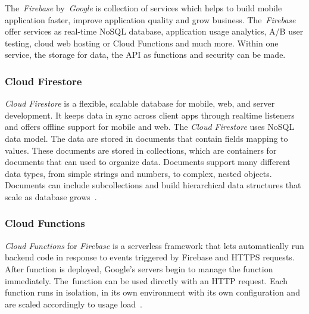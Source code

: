The~\textit{Firebase} by~\textit{Google} is collection of services which helps to build mobile application faster, improve application quality and grow business. The~\textit{Firebase} offer services as real-time NoSQL database, application usage analytics, A/B user testing, cloud web hosting or Cloud Functions and much more. Within one service, the storage for data, the API as functions and security can be made. 
\subsubsection{Cloud Firestore}
\textit{Cloud Firestore} is a flexible, scalable database for mobile, web, and server development. It keeps data in sync across client apps through realtime listeners and offers offline support for mobile and web. The \textit{Cloud Firestore} uses NoSQL data model. The data are stored in documents that contain fields mapping to values. These documents are stored in collections, which are containers for documents that can used to organize data. Documents support many different data types, from simple strings and numbers, to complex, nested objects. Documents can include subcollections and build hierarchical data structures that scale as database grows~\cite{cloud-firestore}.
\subsubsection{Cloud Functions}
\textit{Cloud Functions} for \textit{Firebase} is a serverless framework that lets automatically run backend code in response to events triggered by Firebase and HTTPS requests. After function is deployed, Google's servers begin to manage the function immediately. The~function can be used directly with an HTTP request. Each function runs in isolation, in its own environment with its own configuration and are scaled accordingly to usage load~\cite{cloud-functions}. 
